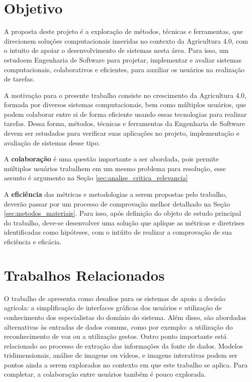\section{Objetivo}
\label{sec:objetivo}

A proposta deste projeto é a exploração de métodos, técnicas e ferramentas, que direcionem soluções computacionais inseridas no contexto da Agricultura 4.0, com o intuito de apoiar o desenvolvimento de sistemas nesta área. Para isso, um estudoem Engenharia de Software para projetar, implementar e avaliar sistemas computacionais, colaborativos e eficientes, para auxiliar os usuários na realização de tarefas.

A motivação para o presente trabalho consiste no crescimento da Agricultura 4.0, formada por diversos sistemas computacionais, bem como múltiplos usuários, que podem colaborar entre si de forma eficiente usando essas tecnologias para realizar tarefas. Dessa forma, métodos, técnicas e ferramentas da Engenharia de Software devem ser estudados
para verificar suas aplicações no projeto, implementação e avaliação de sistemas desse tipo.

A \textbf{colaboração} é uma questão importante a ser abordada, pois permite múltiplos usuários trabalhem em um mesmo problema para resolução, esse assunto é argumento na Seção \ref{sec:analise_critica_relevancia}

A \textbf{eficiência} das métricas e metodologias a serem propostas pelo trabalho, deverão passar por um processo de comprovação melhor detalhado na Seção \ref{sec:metodos_materiais}. Para isso, após definição do objeto de estudo principal do trabalho, deve-se desenvolver uma solução que aplique as métricas e diretrises identificadas como hipóteses, com o intúito de realizar a comprovação de sua eficiência e eficácia.

\section{Trabalhos Relacionados}
\label{sec:trabalhos_relacionados}

O trabalho de  apresenta como desafios para os sistemas de apoio a decisão agrícola: a simplificação de interfaces gráficas dos usuários e utilização de conhecimento dos especialistas do domínio do sistema. Além disso, são abordadas alternativas às entradas de dados comuns, como por exemplo: a utilização do reconhecimento de voz ou a utilização gestos. Outro ponto importante está relacionado ao processo de extração das informações da fonte de dados. Modelos tridimensionais, análise de imagens ou vídeos, e imagens interativas podem ser pontos ainda a serem explorados no contexto em que este trabalho se aplica. Para completar, a colaboração entre usuários também é pouco explorada.

